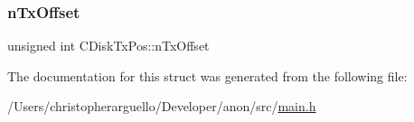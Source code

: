 \mbox{\label{struct_c_disk_tx_pos_af19fa085a69ba3bac7b52413a37adf23}} 
\subsubsection{\texorpdfstring{n\+Tx\+Offset}{nTxOffset}}
{\footnotesize\ttfamily unsigned int C\+Disk\+Tx\+Pos\+::n\+Tx\+Offset}



The documentation for this struct was generated from the following file\+:\begin{DoxyCompactItemize}
\item 
/\+Users/christopherarguello/\+Developer/anon/src/\mbox{\hyperlink{main_8h}{main.\+h}}\end{DoxyCompactItemize}
